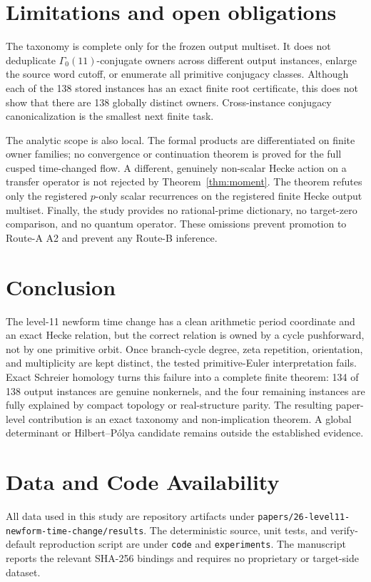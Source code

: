\documentclass[11pt]{article}
\theoremstyle{definition}
\theoremstyle{remark}
\newcommand{\G}{\Gamma_0(11)}
\begin{document}
\section{Limitations and open obligations}

The taxonomy is complete only for the frozen output multiset. It does not deduplicate $\G$-conjugate owners across different output instances, enlarge the source word cutoff, or enumerate all primitive conjugacy classes. Although each of the 138 stored instances has an exact finite root certificate, this does not show that there are 138 globally distinct owners. Cross-instance conjugacy canonicalization is the smallest next finite task.

The analytic scope is also local. The formal products are differentiated on finite owner families; no convergence or continuation theorem is proved for the full cusped time-changed flow. A different, genuinely non-scalar Hecke action on a transfer operator is not rejected by Theorem~\ref{thm:moment}. The theorem refutes only the registered $p$-only scalar recurrences on the registered finite Hecke output multiset. Finally, the study provides no rational-prime dictionary, no target-zero comparison, and no quantum operator. These omissions prevent promotion to Route-A A2 and prevent any Route-B inference.

\section{Conclusion}

The level-11 newform time change has a clean arithmetic period coordinate and an exact Hecke relation, but the correct relation is owned by a cycle pushforward, not by one primitive orbit. Once branch-cycle degree, zeta repetition, orientation, and multiplicity are kept distinct, the tested primitive-Euler interpretation fails. Exact Schreier homology turns this failure into a complete finite theorem: 134 of 138 output instances are genuine nonkernels, and the four remaining instances are fully explained by compact topology or real-structure parity. The resulting paper-level contribution is an exact taxonomy and non-implication theorem. A global determinant or Hilbert--Pólya candidate remains outside the established evidence.

\section*{Data and Code Availability}
All data used in this study are repository artifacts under \texttt{papers/26-level11-newform-time-change/results}. The deterministic source, unit tests, and verify-default reproduction script are under \texttt{code} and \texttt{experiments}. The manuscript reports the relevant SHA-256 bindings and requires no proprietary or target-side dataset.
\end{document}
